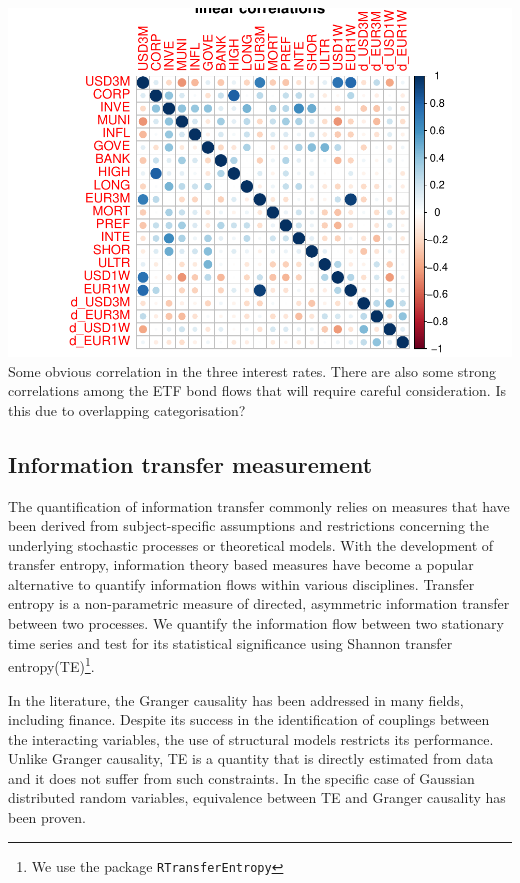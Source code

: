 \documentclass[
]{article}
\begin{document}
\includegraphics{working_paper_files/figure-latex/correlation-1.pdf}
Some obvious correlation in the three interest rates. There are also
some strong correlations among the ETF bond flows that will require
careful consideration. Is this due to overlapping categorisation?

\hypertarget{information-transfer-measurement}{%
\subsection{Information transfer
measurement}\label{information-transfer-measurement}}

The quantification of information transfer commonly relies on measures
that have been derived from subject-specific assumptions and
restrictions concerning the underlying stochastic processes or
theoretical models. With the development of transfer entropy,
information theory based measures have become a popular alternative to
quantify information flows within various disciplines. Transfer entropy
is a non-parametric measure of directed, asymmetric information transfer
between two processes. We quantify the information flow between two
stationary time series and test for its statistical significance using
Shannon transfer entropy(TE)\footnote{We use the package
  \texttt{RTransferEntropy}}.

In the literature, the Granger causality has been addressed in many
fields, including finance. Despite its success in the identification of
couplings between the interacting variables, the use of structural
models restricts its performance. Unlike Granger causality, TE is a
quantity that is directly estimated from data and it does not suffer
from such constraints. In the specific case of Gaussian distributed
random variables, equivalence between TE and Granger causality has been
proven.
\end{document}
